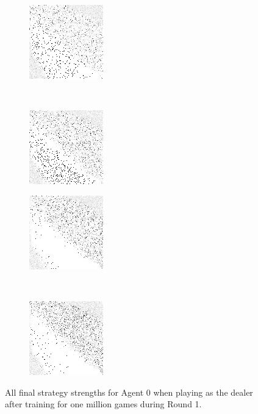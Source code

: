 \begin{figure}
	\begin{subfigure}[b]{0.4\textwidth}
		\includegraphics[height=0.23\textheight]{images/findings/round1/strategies_cribminavg.png}
		\caption{\cribminavg}
	\end{subfigure}
	~
	\begin{subfigure}[b]{0.4\textwidth}
		\includegraphics[height=0.23\textheight]{images/findings/round1/strategies_peggingmaxavggained.png}
		\caption{\peggingmaxavggained}
	\end{subfigure}

	\begin{subfigure}[b]{0.4\textwidth}
		\includegraphics[height=0.23\textheight]{images/findings/round1/strategies_peggingmaxmedgained.png}
		\caption{\peggingmaxmedgained}
	\end{subfigure}
	~
	\begin{subfigure}[b]{0.4\textwidth}
		\includegraphics[height=0.23\textheight]{images/findings/round1/strategies_peggingminavggiven.png}
		\caption{\peggingminavggiven}
	\end{subfigure}

\caption{
	All final strategy strengths for Agent 0
	when playing as the dealer
	after training for one million games during Round 1.
}
\label{fig_r1-strats}
\end{figure}
